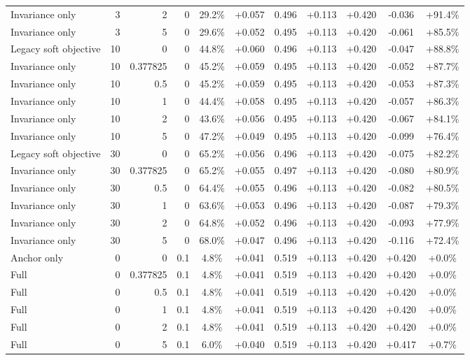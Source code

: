 \begin{table}[htbp]
\begin{tabular}{lrrrccccccc}
Invariance only & 3 & 2 & 0 & 29.2\% & +0.057 & 0.496 & +0.113 & +0.420 & -0.036 & +91.4\% \\
Invariance only & 3 & 5 & 0 & 29.6\% & +0.052 & 0.495 & +0.113 & +0.420 & -0.061 & +85.5\% \\
Legacy soft objective & 10 & 0 & 0 & 44.8\% & +0.060 & 0.496 & +0.113 & +0.420 & -0.047 & +88.8\% \\
Invariance only & 10 & 0.377825 & 0 & 45.2\% & +0.059 & 0.495 & +0.113 & +0.420 & -0.052 & +87.7\% \\
Invariance only & 10 & 0.5 & 0 & 45.2\% & +0.059 & 0.495 & +0.113 & +0.420 & -0.053 & +87.3\% \\
Invariance only & 10 & 1 & 0 & 44.4\% & +0.058 & 0.495 & +0.113 & +0.420 & -0.057 & +86.3\% \\
Invariance only & 10 & 2 & 0 & 43.6\% & +0.056 & 0.495 & +0.113 & +0.420 & -0.067 & +84.1\% \\
Invariance only & 10 & 5 & 0 & 47.2\% & +0.049 & 0.495 & +0.113 & +0.420 & -0.099 & +76.4\% \\
Legacy soft objective & 30 & 0 & 0 & 65.2\% & +0.056 & 0.496 & +0.113 & +0.420 & -0.075 & +82.2\% \\
Invariance only & 30 & 0.377825 & 0 & 65.2\% & +0.055 & 0.497 & +0.113 & +0.420 & -0.080 & +80.9\% \\
Invariance only & 30 & 0.5 & 0 & 64.4\% & +0.055 & 0.496 & +0.113 & +0.420 & -0.082 & +80.5\% \\
Invariance only & 30 & 1 & 0 & 63.6\% & +0.053 & 0.496 & +0.113 & +0.420 & -0.087 & +79.3\% \\
Invariance only & 30 & 2 & 0 & 64.8\% & +0.052 & 0.496 & +0.113 & +0.420 & -0.093 & +77.9\% \\
Invariance only & 30 & 5 & 0 & 68.0\% & +0.047 & 0.496 & +0.113 & +0.420 & -0.116 & +72.4\% \\
Anchor only & 0 & 0 & 0.1 & 4.8\% & +0.041 & 0.519 & +0.113 & +0.420 & +0.420 & +0.0\% \\
Full & 0 & 0.377825 & 0.1 & 4.8\% & +0.041 & 0.519 & +0.113 & +0.420 & +0.420 & +0.0\% \\
Full & 0 & 0.5 & 0.1 & 4.8\% & +0.041 & 0.519 & +0.113 & +0.420 & +0.420 & +0.0\% \\
Full & 0 & 1 & 0.1 & 4.8\% & +0.041 & 0.519 & +0.113 & +0.420 & +0.420 & +0.0\% \\
Full & 0 & 2 & 0.1 & 4.8\% & +0.041 & 0.519 & +0.113 & +0.420 & +0.420 & +0.0\% \\
Full & 0 & 5 & 0.1 & 6.0\% & +0.040 & 0.519 & +0.113 & +0.420 & +0.417 & +0.7\% \\

\end{tabular}
\end{table}
